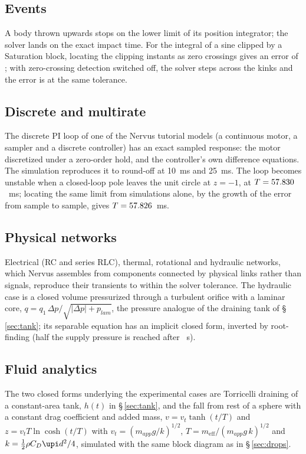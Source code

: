 \documentclass{jfm}
\begin{document}
\subsection{Events}

A body thrown upwards stops on the lower limit of its position integrator; the solver lands on
the exact impact time. For the integral of a sine clipped by a Saturation block, locating the clipping instants as
zero crossings gives an error of \SatErrOn{}; with zero-crossing detection switched off, the solver steps across
the kinks and the error is \SatErrOff{} at the same tolerance.

\subsection{Discrete and multirate}

The discrete PI loop of one of the Nervus tutorial models (a continuous motor,
a sampler and a discrete controller) has an exact sampled response: the motor discretized under a zero-order hold,
and the controller's own difference equations. The simulation reproduces it to round-off at 10~ms and 25~ms. The
loop becomes unstable when a closed-loop pole leaves the unit circle at $z=-1$, at $T = 57.830$~ms; locating
the same limit from simulations alone, by the growth of the error from sample to sample, gives
$T = 57.826$~ms.

\subsection{Physical networks}

Electrical (RC and series RLC), thermal, rotational and hydraulic networks, which
Nervus assembles from components connected by physical links rather than signals, reproduce their transients to
within the solver tolerance. The hydraulic case is a closed volume pressurized through a turbulent orifice with a
laminar core, $q = q_1\,\Delta p/\sqrt{|\Delta p| + p_{lam}}$, the pressure analogue of the draining tank of
\S\,\ref{sec:tank}; its separable equation has an implicit closed form, inverted by root-finding (half the supply
pressure is reached after \HydTHalf~s).

\subsection{Fluid analytics}

The two closed forms underlying the experimental cases are Torricelli draining of a
constant-area tank, $h(t)$ in \S\,\ref{sec:tank}, and the fall from rest of a sphere with a constant drag
coefficient and added mass, $v = v_t\tanh(t/T)$ and $z = v_t T\ln\cosh(t/T)$ with $v_t = (m_{app}g/k)^{1/2}$,
$T = m_{\mathrm{eff}}/(m_{app}g\,k)^{1/2}$ and $k = \frac12\rho C_D \upi d^2/4$, simulated with the same block
diagram as in \S\,\ref{sec:drops}.
\end{document}
